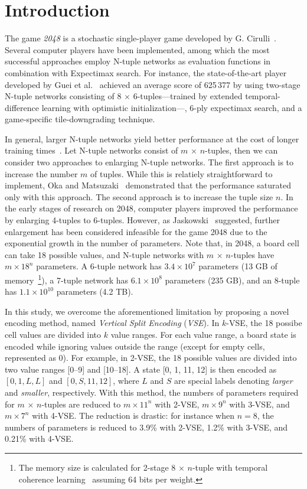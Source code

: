 \section{Introduction}

The game \emph{2048} is a stochastic single-player game developed by G. Cirulli~\cite{2048}.
Several computer players have been implemented, among which the most successful approaches employ N-tuple networks as evaluation functions in combination with Expectimax search.
For instance, the state-of-the-art player developed by Guei et al.~\cite{Guei22} achieved an average score of 625\,377 by using two-stage N-tuple networks consisting of 8 $\times$ 6-tuples---trained by extended temporal-difference learning with optimistic initialization---, 6-ply expectimax search, and a game-specific tile-downgrading technique.


In general, larger N-tuple networks yield better performance at the cost of longer training times~\cite{Terauchi25}.
Let N-tuple networks consist of $m$ $\times$ $n$-tuples, then we can consider two approaches to enlarging N-tuple networks.
The first approach is to increase the number $m$ of tuples.  While this is relatiely straightforward to implement, Oka and Matsuzaki~\cite{OkMa16} demonstrated that the performance saturated only with this approach.
The second approach is to increase the tuple size $n$.  In the early stages of research on 2048, computer players improved the performance by enlarging 4-tuples to 6-tuples.  However, as Jaskowski~\cite{Jask17} suggested, further enlargement has been considered infeasible for the game 2048 due to the exponential growth in the number of parameters.  Note that, in 2048, a board cell can take 18 possible values, and N-tuple networks with $m$ $\times$ $n$-tuples have $m\times 18^n$ parameters.  A 6-tuple network has $3.4\times 10^7$ parameters (13 GB of memory~\footnote{The memory size is calculated for 2-stage 8 $\times$ $n$-tuple with temporal coherence learning~\cite{Jask17} assuming 64 bits per weight.}), a 7-tuple network has $6.1\times 10^8$ parameters (235 GB), and an 8-tuple has $1.1\times 10^10$ parameters (4.2 TB).


In this study, we overcome the aforementioned limitation by proposing a novel encoding method, named \emph{Vertical Split Encoding} (\emph{VSE}). In $k$-VSE, the 18 possibe cell values are divided into $k$ value ranges. For each value range, a board state is encoded while ignoring values outside the range (except for empty cells, represented as 0).
For example, in 2-VSE, the 18 possible values are divided into two value ranges [0--9] and [10--18]. A state [0, 1, 11, 12] is then encoded as $[0, 1, L, L]$ and $[0, S, 11, 12]$, where $L$ and $S$ are special labels denoting \emph{larger} and \emph{smaller}, respectively.
With this method, the numbers of parameters required for $m$ $\times$ $n$-tuples are reduced to $m\times 11^n$ with 2-VSE, $m\times 9^n$ with 3-VSE, and $m\times 7^n$ with 4-VSE. The reduction is drastic: for instance when $n=8$, the numbers of parameters is reduced to 3.9\% with 2-VSE, 1.2\% with 3-VSE, and 0.21\% with 4-VSE.


